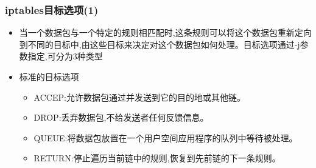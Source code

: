 \documentclass[xcolor=svgnames,presentation]{beamer}
\begin{document}
\begin{frame}
\frametitle{iptables目标选项(1)}
\label{sec-2-27}
\begin{itemize}

\item 当一个数据包与一个特定的规则相匹配时,这条规则可以将这个数据包重新定向到不同的目标中,由这些目标来决定对这个数据包如何处理。目标选项通过-j参数指定,可分为3种类型
\label{sec-2-27-1}%

\item 标准的目标选项
\label{sec-2-27-2}%
\begin{itemize}

\item ACCEP:允许数据包通过并发送到它的目的地或其他链。
\label{sec-2-27-2-1}%

\item DROP:丢弃数据包,不给发送者任何反馈信息。
\label{sec-2-27-2-2}%

\item QUEUE:将数据包放置在一个用户空间应用程序的队列中等待被处理。
\label{sec-2-27-2-3}%

\item RETURN:停止遍历当前链中的规则,恢复到先前链的下一条规则。
\label{sec-2-27-2-4}%
\end{itemize} %
\end{itemize} %
\end{frame}
\end{document}
